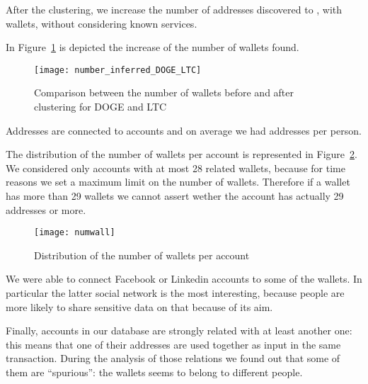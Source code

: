 After the clustering, we increase the number of addresses discovered to
\clusteringNumberAllWallets{}, with \clusteringNumberWalletsNotService{}
wallets, without considering known services.

In Figure~\ref{fig:dogeltcclustered} is depicted the increase of the number of
wallets found.
\begin{figure}[H]
\centering
\texttt{[image: number\_inferred\_DOGE\_LTC]}
\caption{Comparison between the number of wallets before and after clustering
for DOGE and LTC}
\label{fig:dogeltcclustered}
\end{figure}

Addresses are connected to \accountNumber{} accounts and on average we had
\avarageAccount{} addresses per person.

The distribution of the number of wallets per account is represented in
Figure~\ref{fig:numwall}. We considered only accounts with at most 28 related
wallets, because for time reasons we set a maximum limit on the number of
wallets. Therefore if a wallet has more than 29 wallets we cannot assert wether
the account has actually 29 addresses or more.
\begin{figure}[H]
\centering
\texttt{[image: numwall]}
\caption{Distribution of the number of wallets per account}
\label{fig:numwall}
\end{figure}

We were able to connect Facebook or Linkedin accounts to some of the wallets.
In particular the latter social network is the most interesting, because people
are more likely to share sensitive data on that because of its aim. 

Finally, \accountRelated{} accounts in our database are strongly related with
at least another one: this means that one of their addresses are used together
as input in the same transaction. During the analysis of those relations we
found out that some of them are ``spurious'': the wallets seems to belong to
different people.
